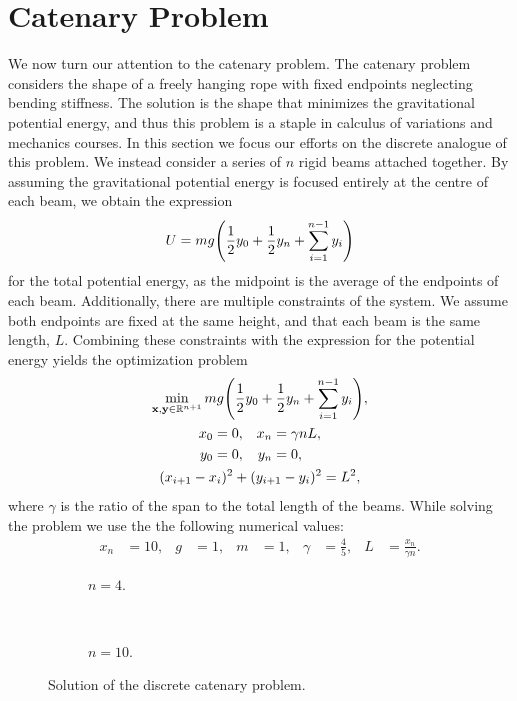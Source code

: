 \documentclass[11pt,a4paper]{article}
\let\originalleft\left
\let\originalright\right
\renewcommand{\left}{\mathopen{}\mathclose\bgroup\originalleft}
\renewcommand{\right}{\aftergroup\egroup\originalright}
\begin{document}
\section{Catenary Problem}
We now turn our attention to the catenary problem. The catenary problem considers the shape of a freely hanging rope with fixed endpoints neglecting bending stiffness. The solution is the shape that minimizes the gravitational potential energy, and thus this problem is a staple in calculus of variations and mechanics courses. In this section we focus our efforts on the discrete analogue of this problem. We instead consider a series of $n$ rigid beams attached together. By assuming the gravitational potential energy is focused entirely at the centre of each beam, we obtain the expression
\begin{align}
	U = m g \left( \frac{1}{2} y_0 + \frac{1}{2} y_n + \sum_{i = 1}^{n-1} y_i \right)
\end{align}
for the total potential energy, as the midpoint is the average of the endpoints of each beam. Additionally, there are multiple constraints of the system. We assume both endpoints are fixed at the same height, and that each beam is the same length, $L$. Combining these constraints with the expression for the potential energy yields the optimization problem
\begin{gather}
	\min_{\mathbf{x}, \mathbf{y} \in \mathbb{R}^{n+1}} m g \left( \frac{1}{2} y_0 + \frac{1}{2} y_n + \sum_{i = 1}^{n-1} y_i \right), \\
	\begin{align}
		x_0 &= 0, & x_n &= \gamma n L, \nonumber \\
		y_0 &=0, & y_n &= 0,
	\end{align} \\
	(x_{i+1} - x_i)^2 + (y_{i+1} - y_i)^2 = L^2, \nonumber
\end{gather}
where $\gamma$ is the ratio of the span to the total length of the beams. While solving the problem we use the the following numerical values:
\begin{align}
	x_n &= 10, & g &= 1, & m &= 1, & \gamma &= \frac{4}{5}, & L &= \frac{x_n}{\gamma n}.
\end{align}

\begin{figure}[tbp]
	\centering
	\begin{subfigure}{\textwidth}
		\centering
		
		\caption{$n = 4$.}
		\label{fig:beam4}
	\end{subfigure} \\
	\begin{subfigure}{\textwidth}
		\centering
		
		\caption{$n = 10$.}
		\label{fig:beam10}	
	\end{subfigure}
	\caption{Solution of the discrete catenary problem.}
	\label{fig:catenary}
\end{figure}
\end{document}

